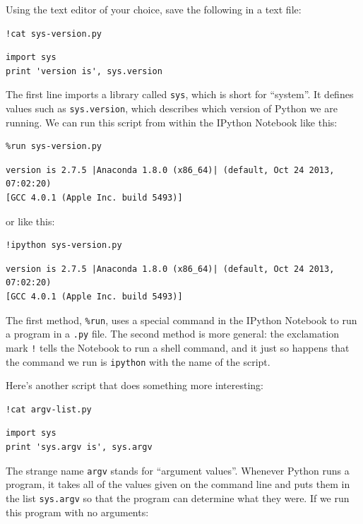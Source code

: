 \documentclass{book}
\begin{document}
Using the text editor of your choice, save the following in a text file:

\begin{verbatim}
!cat sys-version.py
\end{verbatim}

\begin{verbatim}
import sys
print 'version is', sys.version
\end{verbatim}

The first line imports a library called \texttt{sys}, which is short for
``system''. It defines values such as \texttt{sys.version}, which
describes which version of Python we are running. We can run this script
from within the IPython Notebook like this:

\begin{verbatim}
%run sys-version.py
\end{verbatim}

\begin{verbatim}
version is 2.7.5 |Anaconda 1.8.0 (x86_64)| (default, Oct 24 2013, 07:02:20)
[GCC 4.0.1 (Apple Inc. build 5493)]
\end{verbatim}

or like this:

\begin{verbatim}
!ipython sys-version.py
\end{verbatim}

\begin{verbatim}
version is 2.7.5 |Anaconda 1.8.0 (x86_64)| (default, Oct 24 2013, 07:02:20)
[GCC 4.0.1 (Apple Inc. build 5493)]
\end{verbatim}

The first method, \texttt{\%run}, uses a special command in the IPython
Notebook to run a program in a \texttt{.py} file. The second method is
more general: the exclamation mark \texttt{!} tells the Notebook to run
a shell command, and it just so happens that the command we run is
\texttt{ipython} with the name of the script.

Here's another script that does something more interesting:

\begin{verbatim}
!cat argv-list.py
\end{verbatim}

\begin{verbatim}
import sys
print 'sys.argv is', sys.argv
\end{verbatim}

The strange name \texttt{argv} stands for ``argument values''. Whenever
Python runs a program, it takes all of the values given on the command
line and puts them in the list \texttt{sys.argv} so that the program can
determine what they were. If we run this program with no arguments:
\end{document}

